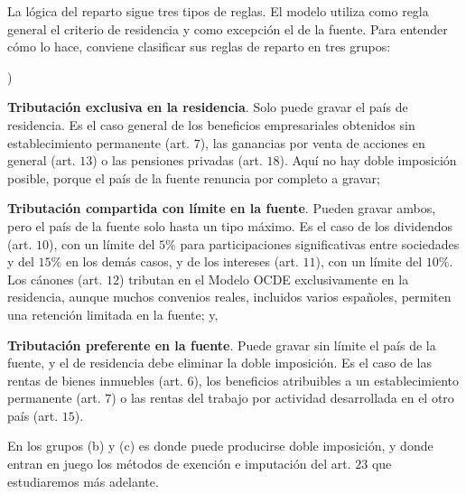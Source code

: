 \documentclass[10pt,a4paper]{article}
\newcounter{alphaitem}
\newenvironment{la}
      {\begin{list}{\alph{alphaitem})}{%
          \usecounter{alphaitem}%
          \setlength{\leftmargin}{1cm}%
          \setlength{\parskip}{3pt}%
          \setlength{\itemsep}{0pt}%
          \setlength{\parsep}{0pt}%
      }}
      {\end{list}}
\begin{document}
La lógica del reparto sigue tres tipos de reglas. El modelo utiliza como regla general el criterio de residencia y como excepción el de la fuente. Para entender cómo lo hace, conviene clasificar sus reglas de reparto en tres grupos:
\begin{la}
    \item \textbf{Tributación exclusiva en la residencia}. Solo puede gravar el país de residencia. Es el caso general de los beneficios empresariales obtenidos sin establecimiento permanente (art. $7$), las ganancias por venta de acciones en general (art. $13$) o las pensiones privadas (art. $18$). Aquí no hay doble imposición posible, porque el país de la fuente renuncia por completo a gravar;
    \item \textbf{Tributación compartida con límite en la fuente}. Pueden gravar ambos, pero el país de la fuente solo hasta un tipo máximo. Es el caso de los dividendos (art. $10$), con un límite del $5\%$ para participaciones significativas entre sociedades y del $15\%$ en los demás casos, y de los intereses (art. $11$), con un límite del $10\%$. Los cánones (art. $12$) tributan en el Modelo OCDE exclusivamente en la residencia, aunque muchos convenios reales, incluidos varios españoles, permiten una retención limitada en la fuente; y,
    \item \textbf{Tributación preferente en la fuente}. Puede gravar sin límite el país de la fuente, y el de residencia debe eliminar la doble imposición. Es el caso de las rentas de bienes inmuebles (art. $6$), los beneficios atribuibles a un establecimiento permanente (art. $7$) o las rentas del trabajo por actividad desarrollada en el otro país (art. $15$).
\end{la}

En los grupos (b) y (c) es donde puede producirse doble imposición, y donde entran en juego los métodos de exención e imputación del art. $23$ que estudiaremos más adelante. 
\end{document}
